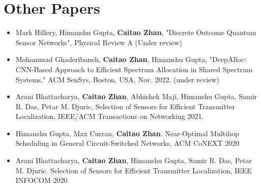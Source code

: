 \section*{Other Papers}
\begin{itemize}

    \item Mark Hillery, Himanshu Gupta, \textbf{Caitao Zhan}, "Discrete Outcome Quantum Sensor Networks", Physical Review A (Under review)

    \item Mohammad Ghaderibaneh, \textbf{Caitao Zhan}, Himanshu Gupta, "DeepAlloc: CNN-Based Approach to Efficient Spectrum Allocation in Shared Spectrum Systems," ACM SenSys, Boston, USA, Nov. 2022. (under review)

    \item Arani Bhattacharya, \textbf{Caitao Zhan}, Abhishek Maji, Himanshu Gupta, Samir R. Das, Petar M. Djuric, Selection of Sensors for Efficient Transmitter Localization, IEEE/ACM Transactions on Networking 2021.

    \item Himanshu Gupta, Max Curran, \textbf{Caitao Zhan}. Near-Optimal Multihop Scheduling in General Circuit-Switched Networks, ACM CoNEXT 2020
    
    \item Arani Bhattacharya, \textbf{Caitao Zhan}, Himanshu Gupta, Samir R. Das, Petar M. Djuric. Selection of Sensors for Efficient Transmitter Localization, IEEE INFOCOM 2020
  
\end{itemize}